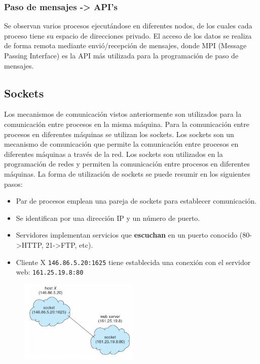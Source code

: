 \documentclass{templateNote}
\begin{document}
\subsubsection*{Paso de mensajes -> API's}
Se observan varios procesos ejecutándose en diferentes nodos, de los cuales cada proceso tiene su espacio de direcciones privado.
El acceso de los datos se realiza de forma remota mediante envió/recepción de mensajes, donde MPI (Message Passing Interface) es la API más utilizada para la programación de paso de mensajes.

\subsection*{Sockets}
Los mecanismos de comunicación vistos anteriormente son utilizados para la comunicación entre procesos en la misma máquina. Para la comunicación entre procesos en diferentes máquinas se utilizan los sockets.
Los sockets son un mecanismo de comunicación que permite la comunicación entre procesos en diferentes máquinas a través de la red. Los sockets son utilizados en la programación de redes y permiten la comunicación entre procesos en diferentes máquinas.
La forma de utilización de sockets se puede resumir en los siguientes pasos:
\begin{itemize}
    \item Par de procesos emplean una pareja de sockets para establecer comunicación.
    \item Se identifican por una dirección IP y un número de puerto.
    \item Servidores implementan servicios que \textbf{escuchan} en un puerto conocido (80->HTTP, 21->FTP, etc).
    \item Cliente X \texttt{146.86.5.20:1625} tiene establecida una conexión con el servidor web: \texttt{161.25.19.8:80} 
\end{itemize}

\begin{figure}[H]
    \centering
    \includegraphics[width=0.5\textwidth]{img/sockets.png}
\end{figure}
\end{document}
